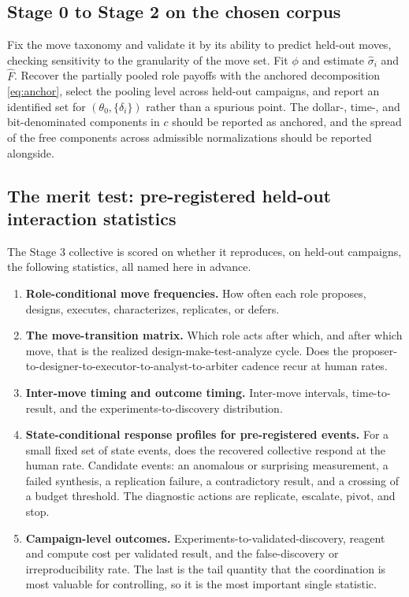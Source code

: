 \documentclass[11pt]{article}
\theoremstyle{definition}
\begin{document}
\subsection{Stage 0 to Stage 2 on the chosen corpus}

Fix the move taxonomy and validate it by its ability to predict held-out moves, checking sensitivity to the granularity of the move set. Fit $\phi$ and estimate $\hat\sigma_i$ and $\hat F$. Recover the partially pooled role payoffs with the anchored decomposition \eqref{eq:anchor}, select the pooling level across held-out campaigns, and report an identified set for $(\theta_0, \{\delta_i\})$ rather than a spurious point. The dollar-, time-, and bit-denominated components in $c$ should be reported as anchored, and the spread of the free components across admissible normalizations should be reported alongside.

\subsection{The merit test: pre-registered held-out interaction statistics}

The Stage 3 collective is scored on whether it reproduces, on held-out campaigns, the following statistics, all named here in advance.

\begin{enumerate}[leftmargin=1.7em,itemsep=2pt,topsep=2pt]
  \item \textbf{Role-conditional move frequencies.} How often each role proposes, designs, executes, characterizes, replicates, or defers.
  \item \textbf{The move-transition matrix.} Which role acts after which, and after which move, that is the realized design-make-test-analyze cycle. Does the proposer-to-designer-to-executor-to-analyst-to-arbiter cadence recur at human rates.
  \item \textbf{Inter-move timing and outcome timing.} Inter-move intervals, time-to-result, and the experiments-to-discovery distribution.
  \item \textbf{State-conditional response profiles for pre-registered events.} For a small fixed set of state events, does the recovered collective respond at the human rate. Candidate events: an anomalous or surprising measurement, a failed synthesis, a replication failure, a contradictory result, and a crossing of a budget threshold. The diagnostic actions are replicate, escalate, pivot, and stop.
  \item \textbf{Campaign-level outcomes.} Experiments-to-validated-discovery, reagent and compute cost per validated result, and the false-discovery or irreproducibility rate. The last is the tail quantity that the coordination is most valuable for controlling, so it is the most important single statistic.
\end{enumerate}
\end{document}

